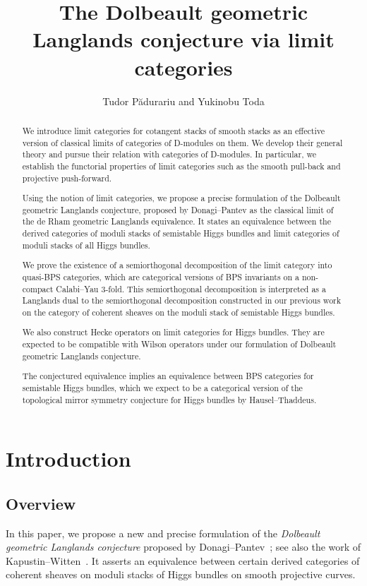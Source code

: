\documentclass [11pt,oneside,a4paper,mathscr]{amsart}
\title[Dolbeault geometric Langlands conjecture]{The Dolbeault geometric Langlands conjecture via limit categories}
\author{Tudor P\u adurariu and Yukinobu Toda}
\theoremstyle{definition}
\begin{document}
\begin{abstract}
We introduce limit categories for cotangent stacks of smooth stacks as an 
effective version of classical limits of categories of D-modules on them. 
We develop their general theory and pursue their relation with categories of D-modules. 
In particular, we establish the functorial properties of limit categories such as the smooth 
pull-back and projective push-forward. 

Using the notion of limit categories, we propose a precise formulation of the Dolbeault geometric Langlands conjecture, proposed by Donagi–Pantev as the classical limit of the de Rham geometric Langlands equivalence. It states an equivalence between the derived categories of moduli stacks of semistable Higgs bundles and 
limit categories of moduli stacks of all Higgs bundles. 




We prove the existence of a semiorthogonal decomposition of the limit category into quasi-BPS categories, which are categorical versions of BPS invariants on a non-compact Calabi–Yau 3-fold.
This semiorthogonal decomposition is interpreted as a Langlands dual to the semiorthogonal decomposition constructed in our previous work on the category of coherent sheaves on the moduli stack of semistable Higgs bundles.

We also construct Hecke operators on limit categories for Higgs bundles. They are expected to be compatible 
with Wilson operators under our formulation of Dolbeault geometric Langlands conjecture. 

The conjectured equivalence implies an equivalence between BPS categories for semistable Higgs bundles, which we expect to be a categorical version of the topological mirror symmetry conjecture for Higgs bundles by Hausel--Thaddeus. 

\end{abstract}



\maketitle


 \setcounter{tocdepth}{2}
\tableofcontents


\section{Introduction}
\subsection{Overview}
In this paper, we propose a new and precise formulation of the \textit{Dolbeault geometric Langlands conjecture} proposed by Donagi--Pantev~\cite{DoPa}; see also the work of Kapustin--Witten~\cite{KapWit}. It asserts an equivalence between certain derived categories of coherent sheaves on moduli stacks of Higgs bundles on smooth projective curves.
\end{document}
